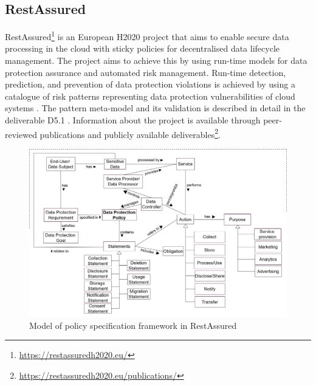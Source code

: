 \subsection*{RestAssured}
RestAssured\footnote{\url{https://restassuredh2020.eu/}} is an European H2020 project that aims to enable secure data processing in the cloud with sticky policies for decentralised data lifecycle management.
The project aims to achieve this by using run-time models for data protection assurance and automated risk management. Run-time detection, prediction, and prevention of data protection violations is achieved by using a catalogue of risk patterns representing data protection vulnerabilities of cloud systems \cite{palm_modelling_2018,braubach_using_2018}. The pattern meta-model and its validation is described in detail in the deliverable D5.1 \cite{noauthor_d5.1_2018}. Information about the project is available through peer-reviewed publications and publicly available deliverables\footnote{\url{https://restassuredh2020.eu/publications/}}.
\begin{figure}[htbp]
    \centering
    \includegraphics[width=\linewidth]{img/RestAssured_model.png}
    \caption{Model of policy specification framework in RestAssured \cite{RestAssured_D6.1}}
    \label{fig:RestAssured-model}
\end{figure}

